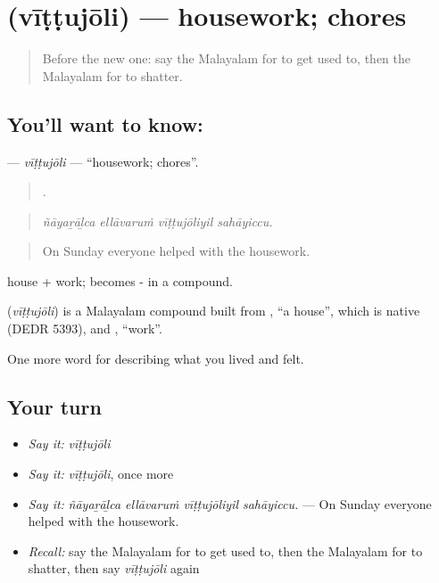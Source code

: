 \section[\texorpdfstring{\ml{വീട്ടുജോലി} (vīṭṭujōli)}{വീട്ടുജോലി (vīṭṭujōli)}]{ (vīṭṭujōli) — housework; chores}

\label{lesson:ML-C572-vittujoli}



\begin{quote}
Before the new one: say the Malayalam for to get used to, then the Malayalam for to shatter.
\end{quote}

\subsection*{You'll want to know: }
\textbf{} — \emph{vīṭṭujōli} — \textquotedblleft{}housework; chores\textquotedblright{}.

\begin{quote}
   .
\end{quote}

\begin{quote}
\emph{ñāyaṟāḻca ellāvaruṁ vīṭṭujōliyil sahāyiccu.}
\end{quote}

\begin{quote}
On Sunday everyone helped with the housework.
\end{quote}

 house +  work;  becomes - in a compound.

\begin{cousinweb}
\textbf{} (\emph{vīṭṭujōli}) is a Malayalam compound built from , \textquotedblleft{}a house\textquotedblright{}, which is native (DEDR 5393), and , \textquotedblleft{}work\textquotedblright{}.
\end{cousinweb}

\begin{grammarlens}[title={What you've built}]
One more word for describing what you lived and felt.
\end{grammarlens}

\subsection*{Your turn}
\begin{itemize}
\raggedright
  \item \emph{Say it:} \emph{vīṭṭujōli}
  \item \emph{Say it:} \emph{vīṭṭujōli}, once more
  \item \emph{Say it:} \emph{ñāyaṟāḻca ellāvaruṁ vīṭṭujōliyil sahāyiccu.} — On Sunday everyone helped with the housework.
  \item \emph{Recall:} say the Malayalam for to get used to, then the Malayalam for to shatter, then say \emph{vīṭṭujōli} again
\end{itemize}

